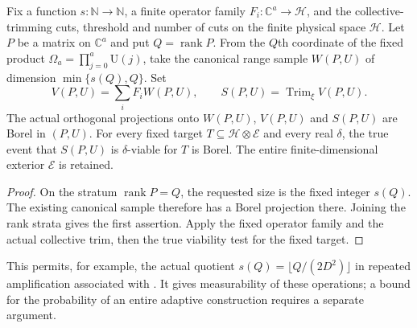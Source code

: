 \begin{lemma}
    \label{lem:borel_rank_size_sample_family_trim}
    \leanok
    Fix a function $s:\mathbb N\to\mathbb N$, a finite operator family
    $F_i:\mathbb C^a\to\mathcal H$, and the collective-trimming cuts,
    threshold and number of cuts on the finite physical space
    $\mathcal H$. Let $P$ be a matrix on $\mathbb C^a$ and put
    $Q=\operatorname{rank}P$. From the $Q$th coordinate of the fixed
    product $\Omega_a=\prod_{j=0}^a\mathrm U(j)$, take the canonical
    range sample $W(P,U)$ of dimension $\min\{s(Q),Q\}$. Set
    \[
       V(P,U)=\sum_i F_iW(P,U),\qquad
       S(P,U)=\operatorname{Trim}_\xi V(P,U).
    \]
    The actual orthogonal projections onto $W(P,U)$, $V(P,U)$ and
    $S(P,U)$ are Borel in $(P,U)$. For every fixed target
    $T\subseteq\mathcal H\otimes\mathcal E$ and every real $\delta$,
    the true event that $S(P,U)$ is $\delta$-viable for $T$ is Borel.
    The entire finite-dimensional exterior $\mathcal E$ is retained.
\end{lemma}
\begin{proof}\leanok
    On the stratum $\operatorname{rank}P=Q$, the requested size is the
    fixed integer $s(Q)$. The existing canonical sample therefore has
    a Borel projection there. Joining the rank strata gives the first
    assertion. Apply the fixed operator family and the actual collective
    trim, then the true viability test for the fixed target.
\end{proof}

This permits, for example, the actual quotient
$s(Q)=\lfloor Q/(2D^2)\rfloor$ in repeated amplification associated with
\cite{Arad2016RigorousRG}. It gives measurability of these operations;
a bound for the probability of an entire adaptive construction requires
a separate argument.
